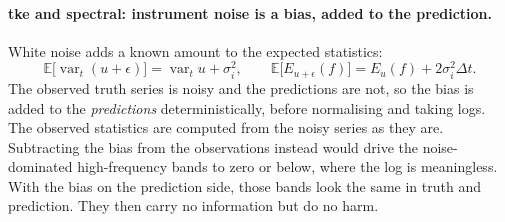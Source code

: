 \documentclass[11pt,a4paper]{article}
\begin{document}
\paragraph{tke and spectral: instrument noise is a bias, added to the
prediction.} White noise adds a known amount to the expected statistics:
\begin{equation}
  \mathbb E\big[\operatorname{var}_t(u + \epsilon)\big] = \operatorname{var}_t u + \sigma_i^2,
  \qquad
  \mathbb E\big[E_{u+\epsilon}(f)\big] = E_u(f) + 2\sigma_i^2\Delta t .
\end{equation}
The observed truth series is noisy and the predictions are not, so the
bias is added to the \emph{predictions} deterministically, before normalising
and taking logs. The observed statistics are computed from the noisy series
as they are. Subtracting the bias from the observations instead would drive
the noise-dominated high-frequency bands to zero or below, where the log is
meaningless. With the bias on the prediction side, those bands look the same
in truth and prediction. They then carry no information but do no harm.
\end{document}
